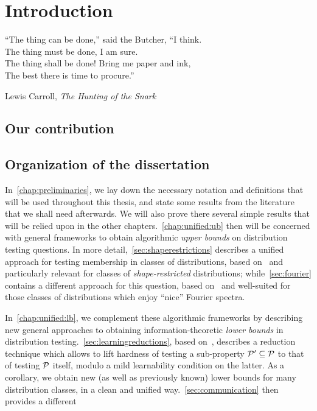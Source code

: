 \chapter*{Introduction} %

\epigraph{``The thing can be done,'' said the Butcher, ``I think.\\
The thing must be done, I am sure.\\
The thing shall be done! Bring me paper and ink,\\
The best there is time to procure.''}{Lewis Carroll, \textit{The Hunting of the Snark}}

\section*{Our contribution}

\section*{Organization of the dissertation}

In~\cref{chap:preliminaries}, we lay down the necessary notation and definitions that will be used throughout this thesis, and state some results from the literature that we shall need afterwards. We will also prove there several simple results that will be relied upon in the other chapters.~\cref{chap:unified:ub} then will be concerned with general frameworks to obtain algorithmic \emph{upper bounds} on distribution testing questions. In more detail,~\cref{sec:shaperestrictions} describes a unified approach for testing membership in classes of distributions, based on~\cite{CDGR:16} and particularly relevant for classes of \emph{shape-restricted} distributions; while~\cref{sec:fourier} contains a different approach for this question, based on~\cite{CDS:17} and well-suited for those classes of distributions which enjoy ``nice'' Fourier spectra.

In~\cref{chap:unified:lb}, we complement these algorithmic frameworks by describing new general approaches to obtaining information-theoretic \emph{lower bounds} in distribution testing.~\cref{sec:learningreductions}, based on~\cite{CDGR:16}, describes a reduction technique which allows to lift hardness of testing a sub-property $\mathcal{P}'\subseteq\mathcal{P}$ to that of testing $\mathcal{P}$ itself, modulo a mild learnability condition on the latter. As a corollary, we obtain new (as well as previously known) lower bounds for many distribution classes, in a clean and unified way.~\cref{sec:communication} then provides a different 
